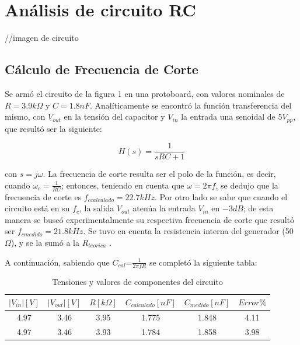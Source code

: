 





\section{Análisis de circuito RC}

//imagen de circuito

\subsection{Cálculo de Frecuencia de Corte}

Se armó el circuito de la figura 1 en una protoboard, con valores
nominales de $R=3.9k\Omega$ y $C=1.8nF$. Analíticamente se encontró
la función transferencia del mismo, con $V_{out}$ en la tensión del
capacitor y $V_{in}$ la entrada una senoidal de $5$$V_{pp}$, que
resultó ser la siguiente:

\[
H(s)=\frac{1}{sRC+1}
\]

con $s=j\omega.$ La frecuencia de corte resulta ser el polo de la función, es decir, cuando $\omega_{c}=\frac{1}{RC}$;
entonces, teniendo en cuenta que $\omega=2\pi f$, se dedujo que la
frecuencia de corte es $f_{ccalculado}=22.7kHz$. Por
otro lado se sabe que cuando el circuito está en su $f_{c}$, la salida
$V_{out}$ atenúa la entrada $V_{in}$ en $-3dB$; de esta manera
se buscó experimentalmente su respectiva frecuencia de corte que resultó
ser $f_{cmedido}=21.8kHz$. Se tuvo en cuenta la resistencia interna
del generador (50$\Omega$), y se la sumó a la $R_{teorica}$ .

A continuación, sabiendo que $C_{cal}\text{=}\frac{1}{2\pi fR}$ se
completó la siguiente tabla:

\begin{table}
\begin{center}
\begin{tabular}{|c|c|c|c|c|c|}
\hline 
$|V_{in}|[V]$ & $|V_{out}|[V]$ & $R[k\varOmega]$ & $C_{calculado}[nF]$ & $C_{medido}[nF]$ & $Error\%$\tabularnewline
\hline 
\hline 
4.97 & 3.46 & 3.95 & 1.775 & 1.848 & 4.11\tabularnewline
\hline 
4.97 & 3.46 & 3.93 & 1.784 & 1.858 & 3.98\tabularnewline
\hline 
\end{tabular}
\par\end{center}
\caption{Tensiones y valores de componentes del circuito }
\end{table}

